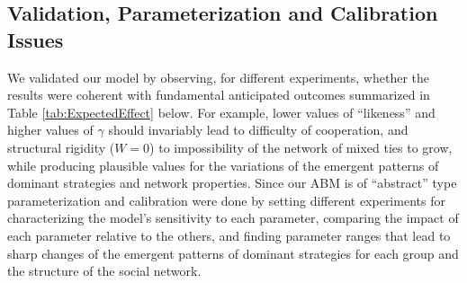 \subsection{Validation, Parameterization and Calibration Issues}
We validated our model by observing, for different experiments, whether the results were coherent with fundamental anticipated outcomes summarized in Table \ref{tab:ExpectedEffect} below. For example, lower values of ``likeness'' and higher values of $ \gamma $ should invariably lead to difficulty of cooperation, and structural rigidity ($ W = 0 $) to impossibility of the network of mixed ties to grow, while producing plausible values for the variations of the emergent patterns of dominant strategies and network properties. Since our ABM is of ``abstract'' type parameterization and calibration were done by setting different experiments for characterizing the model's sensitivity to each parameter, comparing the impact of each parameter relative to the others, and finding parameter ranges that lead to sharp changes of the emergent patterns of dominant strategies for each group and the structure of the social network. 

